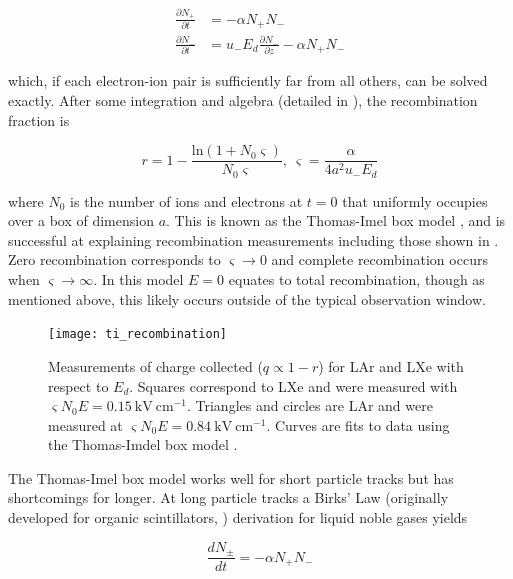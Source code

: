 \begin{subequations}
\begin{align}
\frac{\partial N_{+}}{\partial t} &= - \alpha N_{+} N_{-}
\label{eq:diff_simple_plus} \\
\frac{\partial N_{-}}{\partial t} &= u_{-} E_d \frac{\partial N_{-}}{\partial z} - \alpha N_{+} N_{-}
\label{eq:diff_simple_minus}
\end{align}
\end{subequations}

\noindent which, if each electron-ion pair is sufficiently far from all others, can be solved exactly.  After some integration and algebra
(detailed in ), the recombination fraction is

\begin{equation}
r = 1 - \frac{\mathrm{ln} (1 + N_0 \varsigma)}{N_0 \varsigma},\ \varsigma = \frac{\alpha}{4 a^{2} u_{-} E_d}
\label{eq:ti_recomb}
\end{equation}

\noindent where $N_0$ is the number of ions and electrons at $t = 0$ that uniformly occupies over a box of dimension $a$.  This is known
as the Thomas-Imel box model ,
and is successful at explaining recombination measurements including those shown in .  Zero recombination
corresponds to
$\varsigma \rightarrow 0$ and complete recombination occurs when $\varsigma \rightarrow \infty$.  In this model $E = 0$ equates to total
recombination, though as mentioned above, this likely occurs outside of the typical observation window.

\begin{figure}
\texttt{[image: ti\_recombination]}
\caption{Measurements of charge collected ($q \propto 1 - r$) for LAr and LXe with respect to $E_d$.  Squares correspond to LXe and were
measured with $\varsigma N_0 E = 0.15\ \mathrm{kV\ cm^{-1}}$.  Triangles and circles are LAr and were measured at
$\varsigma N_0 E = 0.84\ \mathrm{kV\ cm^{-1}}$.  Curves are fits to data using the Thomas-Imdel box model .}
\label{fig:ti_recomb}
\end{figure}

The Thomas-Imel box model works well for short particle tracks but has shortcomings for longer.  At long particle tracks a Birks'
Law (originally developed for organic scintillators, ) derivation for liquid noble gases yields

\begin{equation}
\frac{dN_{\pm}}{dt} = -\alpha N_{+} N_{-}
\label{eq:birks_diff}
\end{equation}

